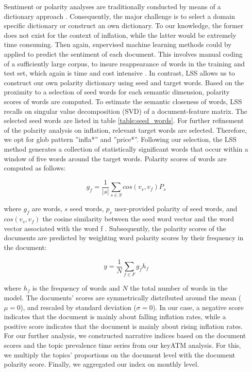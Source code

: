


\normalsize

Sentiment or polarity analyses are traditionally conducted by means of a dictionary approach \citep[180]{grimmer.2022}. Consequently, the major challenge is to select a domain specific dictionary or construct an own dictionary. To our knowledge, the former does not exist for the context of inflation, while the latter would be extremely time consuming. Then again, supervised machine learning methods could by applied to predict the sentiment of each document. This involves manual coding of a sufficiently large corpus, to insure reappearance of words in the training and test set, which again is time and cost intensive \citep[84]{Watanabe.2021}. In contrast, \textsf{LSS} allows us to construct our own polarity dictionary using seed and target words. Based on the proximity to a selection of seed words for each semantic dimension, polarity scores of words are computed. To estimate the semantic closeness of words, LSS recalls on singular value decomposition (SVD) of a document-feature matrix. The selected seed words are listed in table \ref{table:seed_words}. For further refinement of the polarity analysis on inflation, relevant target words are selected. Therefore, we opt for glob pattern ''infla*'' and ''price*''. Following our selection, the LSS method generates a collection of statistically significant words that occur within a window of five words around the target words. Polarity scores of words are computed as follows:

\begin{equation}
	g_f=\frac{1}{|s|}\sum_{s\in S}cos(v_s, v_f)P_s
\end{equation}


where $g_f$ are words, $s$ seed words, $p_s$ user-provided polarity of seed words, and $cos(v_s, v_f)$ the cosine similarity between the seed word vector and the word vector associated with the word f \citep[86]{Watanabe.2021}. Subsequently, the polarity scores of the documents are predicted by weighting word polarity scores by their frequency in the document: 

\begin{equation}
	y=\frac{1}{N}\sum_{f\in F}g_fh_f
\end{equation}

where $h_f$ is the frequency of words and $N$ the total number of words in the model. The documents' scores are symmetrically distributed around the mean ($\mu = 0$), and rescaled by standard deviation ($\sigma = 0$). In our case, a negative score indicates that the document is mainly about falling inflation rates, while a positive score indicates that the document is mainly about rising inflation rates. For our further analysis, we constructed narrative indices based on the document scores and the topic prevalence time series from our \textsf{keyATM} analysis. For this, we multiply the topics' proportions on the document level with the document polarity score. Finally, we aggregated our index on monthly level. 

